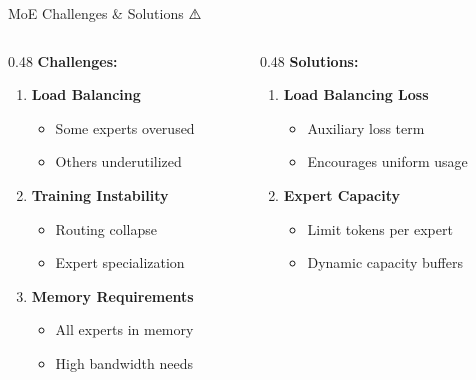 \documentclass[aspectratio=169]{beamer}
\begin{document}
\begin{frame}[shrink=10]{MoE Challenges \& Solutions ⚠️}
\begin{columns}[T]
\begin{column}{0.48\textwidth}
\textbf{Challenges:}
\begin{enumerate}\setlength{\itemsep}{0pt}
    \item \textbf{Load Balancing}
    \begin{itemize}\setlength{\itemsep}{0pt}
        \item Some experts overused
        \item Others underutilized
    \end{itemize}

    \vspace{0.3em}

    \item \textbf{Training Instability}
    \begin{itemize}\setlength{\itemsep}{0pt}
        \item Routing collapse
        \item Expert specialization
    \end{itemize}

    \vspace{0.3em}

    \item \textbf{Memory Requirements}
    \begin{itemize}\setlength{\itemsep}{0pt}
        \item All experts in memory
        \item High bandwidth needs
    \end{itemize}
\end{enumerate}
\end{column}

\begin{column}{0.48\textwidth}
\textbf{Solutions:}
\begin{enumerate}\setlength{\itemsep}{0pt}
    \item \textbf{Load Balancing Loss}
    \begin{itemize}\setlength{\itemsep}{0pt}
        \item Auxiliary loss term
        \item Encourages uniform usage
    \end{itemize}

    \vspace{0.3em}

    \item \textbf{Expert Capacity}
    \begin{itemize}\setlength{\itemsep}{0pt}
        \item Limit tokens per expert
        \item Dynamic capacity buffers
    \end{itemize}


\end{enumerate}
\end{column}
\end{columns}
\end{frame}
\end{document}
